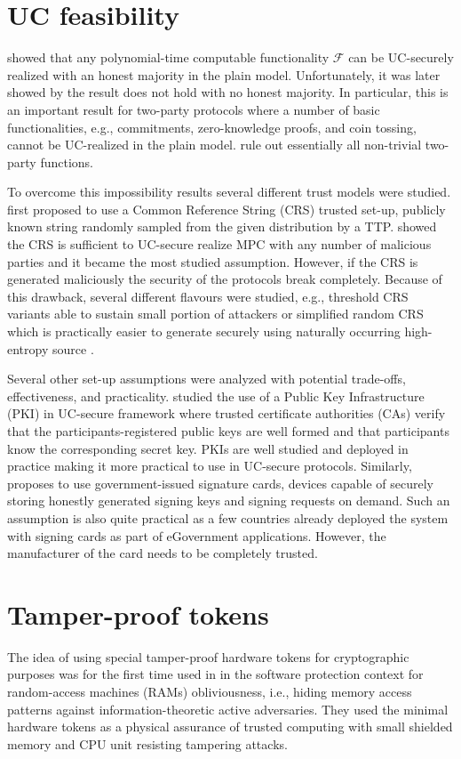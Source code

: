 \documentclass[
  digital, %
  twoside, %
  table,   %
  lof,     %
  lot,     %
]{fithesis3}
\theoremstyle{definition}
\theoremstyle{remark}
\begin{document}
\section{UC feasibility}\label{sec:soa:uc_feasibility}
\cite{Can01} showed that any polynomial-time computable functionality $\mathcal{F}$ can be UC-securely realized with an honest majority in the plain model. Unfortunately, it was later showed by \cite{CF01} the result does not hold with no honest majority. In particular, this is an important result for two-party protocols where a number of basic functionalities, e.g., commitments, zero-knowledge proofs, and coin tossing, cannot be UC-realized in the plain model. \cite{Lin03, CKL04, CKL06} rule out essentially all non-trivial two-party functions.

To overcome this impossibility results several different trust models were studied. 
\cite{CF01} first proposed to use a Common Reference String (CRS) trusted set-up, publicly known string randomly sampled from the given distribution by a TTP. \cite{CLOS02} showed the CRS is sufficient to UC-secure realize MPC with any number of malicious parties and it became the most studied assumption. However, if the CRS is generated maliciously the security of the protocols break completely. Because of this drawback, several different flavours were studied, e.g., threshold CRS variants able to sustain small portion of attackers or simplified random CRS which is practically easier to generate securely using naturally occurring high-entropy source \cite{CPS07}.

Several other set-up assumptions were analyzed with potential trade-offs, effectiveness, and practicality. \cite{BCNP04} studied the use of a Public Key Infrastructure (PKI) in UC-secure framework where trusted certificate authorities (CAs) verify that the participants-registered public keys are well formed and that participants know the corresponding secret key. PKIs are well studied and deployed in practice making it more practical to use in UC-secure protocols. Similarly, \cite{HUU07} proposes to use government-issued signature cards, devices capable of securely storing honestly generated signing keys and signing requests on demand. Such an assumption is also quite practical as a few countries already deployed the system with signing cards as part of eGovernment applications. However, the manufacturer of the card needs to be completely trusted.

\section{Tamper-proof tokens}\label{sec:soa:tokens}
The idea of using special tamper-proof hardware tokens for cryptographic purposes was for the first time used in \cite{GO96} in the software protection context for random-access machines (RAMs) obliviousness, i.e., hiding memory access patterns against information-theoretic active adversaries. They used the minimal hardware tokens as a physical assurance of trusted computing with small shielded memory and CPU unit resisting tampering attacks.
\end{document}
